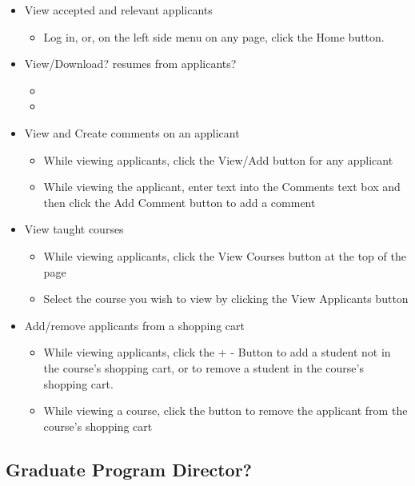 \documentclass[11pt]{amsart}
\begin{document}
\begin{itemize}
	\item{View accepted and relevant applicants}
	\begin{itemize}
		\item{Log in, or, on the left side menu on any page, click the Home button.}
	\end{itemize}
	\item{View/Download? resumes from applicants?}
	\begin{itemize}
		\item{}
		\item{}
	\end{itemize}
	\item{View and Create comments on an applicant}
	\begin{itemize}
		\item{While viewing applicants, click the View/Add button for any applicant}
		\item{While viewing the applicant, enter text into the Comments text box and then click the Add Comment button to add a comment}
	\end{itemize}
	\item{View taught courses}
	\begin{itemize}
		\item{While viewing applicants, click the View Courses button at the top of the page}
		\item{Select the course you wish to view by clicking the View Applicants button}
	\end{itemize}
	\item{Add/remove applicants from a shopping cart}
	\begin{itemize}
		\item{While viewing applicants, click the + - Button to add a student not in the course's shopping cart, or to remove a student in the course's shopping cart.}
		\item{While viewing a course, click the button to remove the applicant from the course's shopping cart}
	\end{itemize}
\end{itemize}

\subsection{Graduate Program Director?}
\end{document}
